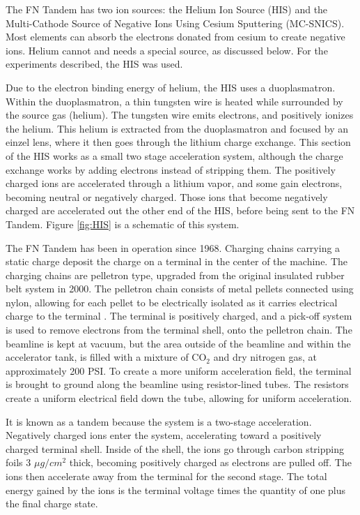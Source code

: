 The FN Tandem has two ion sources: the Helium Ion Source (HIS) and the Multi-Cathode Source of Negative Ions Using Cesium Sputtering (MC-SNICS). Most elements can absorb the electrons donated from cesium to create negative ions. Helium cannot and needs a special source, as discussed below. For the experiments described, the HIS was used.

Due to the electron binding energy of helium, the HIS uses a duoplasmatron. Within the duoplasmatron, a thin tungsten wire is heated while surrounded by the source gas (helium). The tungsten wire emits electrons, and positively ionizes the helium. This helium is extracted from the duoplasmatron and focused by an einzel lens, where it then goes through the lithium charge exchange. This section of the HIS works as a small two stage acceleration system, although the charge exchange works by adding electrons instead of stripping them. The positively charged ions are accelerated through a lithium vapor, and some gain electrons, becoming neutral or negatively charged. Those ions that become negatively charged are accelerated out the other end of the HIS, before being sent to the FN Tandem. Figure \ref{fig:HIS} is a schematic of this system.



The FN Tandem has been in operation since 1968. Charging chains carrying a static charge deposit the charge on a terminal in the center of the machine. The charging chains are pelletron type, upgraded from the original insulated rubber belt system in 2000. The pelletron chain consists of metal pellets connected using nylon, allowing for each pellet to be electrically isolated as it carries electrical charge to the terminal \citep{nec:_pelletron}. The terminal is positively charged, and a pick-off system is used to remove electrons from the terminal shell, onto the pelletron chain. The beamline is kept at vacuum, but the area outside of the beamline and within the accelerator tank, is filled with a mixture of CO$_2$ and dry nitrogen gas, at approximately 200 PSI. To create a more uniform acceleration field, the terminal is brought to ground along the beamline using resistor-lined tubes. The resistors create a uniform electrical field down the tube, allowing for uniform acceleration.

It is known as a tandem because the system is a two-stage acceleration. Negatively charged ions enter the system, accelerating toward a positively charged terminal shell. Inside of the shell, the ions go through carbon stripping foils 3 $\mu g/cm^2$ thick, becoming positively charged as electrons are pulled off. The ions then accelerate away from the terminal for the second stage. The total energy gained by the ions is the terminal voltage times the quantity of one plus the final charge state.

